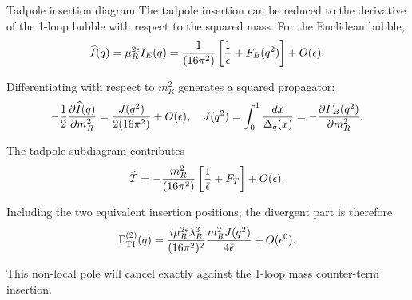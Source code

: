 \documentclass[aspectratio=169,10pt]{beamer}
\begin{document}
\begin{frame}{Tadpole insertion diagram}
\small
The tadpole insertion can be reduced to the derivative of the
1-loop bubble with respect to the squared mass. For the Euclidean bubble,
\begin{equation}
\widehat I(q)
=
\mu_R^{2\epsilon}I_E(q)
=
\frac1{(16\pi^2)}
\left[
\frac1{\bar\epsilon}
+
F_B(q^2)
\right]
+
O(\epsilon).
\end{equation}

Differentiating with respect to $m_R^2$ generates a squared
propagator:
\begin{equation}
-\frac12
\frac{\partial \widehat I(q)}
{\partial m_R^2}
=
\frac{J(q^2)}{2(16\pi^2)}
+
O(\epsilon),\quad 
J(q^2)
=
\int_0^1
\frac{dx}{\Delta_q(x)}
=
-\frac{\partial F_B(q^2)}
{\partial m_R^2}.
\end{equation}

The tadpole subdiagram contributes
\begin{equation}
\widehat T
=
-\frac{m_R^2}{(16\pi^2)}
\left[
\frac1{\bar\epsilon}
+
F_T
\right]
+
O(\epsilon).
\end{equation}

Including the two equivalent insertion positions, the divergent
part is therefore
\begin{equation}
\Gamma_{\mathrm{TI}}^{(2)}(q)
=
\frac{i\mu_R^{2\epsilon}\lambda_R^3}
{(16\pi^2)^2}
\frac{m_R^2J(q^2)}
{4\bar\epsilon}
+
O(\epsilon^0).
\end{equation}

This non-local pole will cancel exactly against the
1-loop mass counter-term insertion.

\end{frame}
\end{document}
